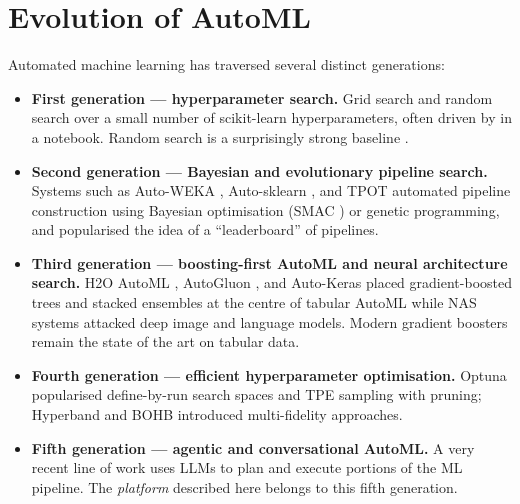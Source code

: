 \section{Evolution of AutoML}
\label{sec:evolution-automl}

Automated machine learning has traversed several distinct generations:

\begin{itemize}[leftmargin=1.3em]
  \item \textbf{First generation --- hyperparameter search.} Grid search
        and random search over a small number of scikit-learn
        \citep{sklearn2011} hyperparameters, often driven by
         in a notebook. Random search is a
        surprisingly strong baseline \citep{bergstra2012random}.
  \item \textbf{Second generation --- Bayesian and evolutionary
        pipeline search.} Systems such as Auto-WEKA
        \citep{thornton2013autoweka}, Auto-sklearn
        \citep{feurer2015autosklearn}, and TPOT \citep{olson2016tpot}
        automated pipeline construction using Bayesian optimisation
        (SMAC \citep{hutter2011smac}) or genetic programming, and
        popularised the idea of a ``leaderboard'' of pipelines.
  \item \textbf{Third generation --- boosting-first AutoML and neural
        architecture search.} H2O AutoML \citep{ledell2020h2o},
        AutoGluon \citep{erickson2020autogluon}, and Auto-Keras
        \citep{jin2019autokeras} placed gradient-boosted trees and
        stacked ensembles at the centre of tabular AutoML while NAS
        systems \citep{zoph2017nas, real2019regularized} attacked deep
        image and language models. Modern gradient boosters
        \citep{chen2016xgboost, ke2017lightgbm, prokhorenkova2018catboost}
        remain the state of the art on tabular data.
  \item \textbf{Fourth generation --- efficient hyperparameter
        optimisation.} Optuna \citep{akiba2019optuna} popularised
        define-by-run search spaces and TPE
        \citep{bergstra2011algorithms} sampling with pruning; Hyperband
        \citep{li2017hyperband} and BOHB \citep{falkner2018bohb}
        introduced multi-fidelity approaches.
  \item \textbf{Fifth generation --- agentic and conversational
        AutoML.} A very recent line of work
        \citep{hollmann2024caafe, guo2024dsagents} uses LLMs to plan
        and execute portions of the ML pipeline. The
        \emph{platform} described here belongs to this fifth
        generation.
\end{itemize}

